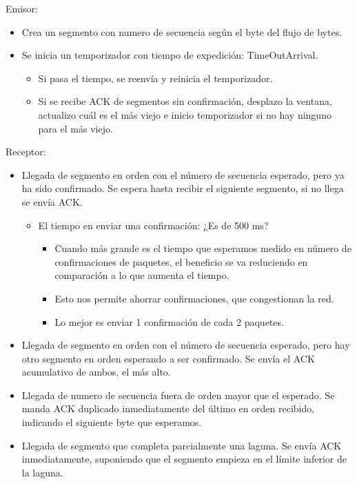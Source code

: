 \documentclass[12pt, twoside, openright]{report} %
\begin{document}
Emisor:

\begin{itemize}
	\item Crea un segmento con numero de secuencia según el byte del flujo
	      de bytes.
	\item Se inicia un temporizador con tiempo de expedición:
	      TimeOutArrival.

	      \begin{itemize}
		      \item Si pasa el tiempo, se reenvía y reinicia el temporizador.
		      \item Si se recibe ACK de segmentos sin confirmación, desplazo la
		            ventana, actualizo cuál es el más viejo e inicio temporizador si
		            no hay ninguno para el más viejo.
	      \end{itemize}
\end{itemize}
\pagebreak

Receptor:

\begin{itemize}
	\item Llegada de segmento en orden con el número de secuencia esperado,
	      pero ya ha sido confirmado. Se espera hasta recibir el siguiente
	      segmento, si no llega se envía ACK.

	      \begin{itemize}
		      \item El tiempo en enviar una confirmación: ¿Es de 500 ms?

		            \begin{itemize}
			            \item Cuando más grande es el tiempo que esperamos medido en número
			                  de confirmaciones de paquetes, el beneficio se va reduciendo
			                  en comparación a lo que aumenta el tiempo.
			            \item Esto nos permite ahorrar confirmaciones, que congestionan la
			                  red.
			            \item Lo mejor es enviar 1 confirmación de cada 2 paquetes.
		            \end{itemize}
	      \end{itemize}
	\item Llegada de segmento en orden con el número de secuencia esperado,
	      pero hay otro segmento en orden esperando a ser confirmado. Se
	      envía el ACK acumulativo de ambos, el más alto.
	\item Llegada de numero de secuencia fuera de orden mayor que el
	      esperado. Se manda ACK duplicado inmediatamente del último en
	      orden recibido, indicando el siguiente byte que esperamos.
	\item Llegada de segmento que completa parcialmente una laguna. Se envía
	      ACK inmediatamente, suponiendo que el segmento empieza en el
	      límite inferior de la laguna.
\end{itemize}
\end{document}

